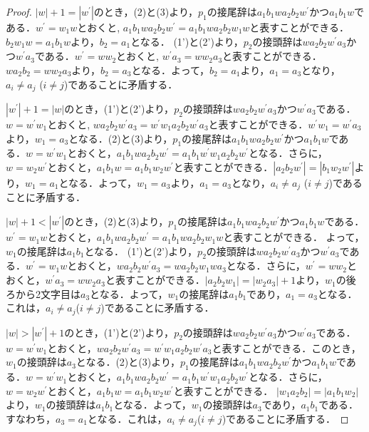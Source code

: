 \begin{proof}
$|w|+1=|w^{\prime}|$のとき，(2)と(3)より，$p_{1}$の接尾辞は$a_{1}b_{1}wa_{2}b_{2}w^{\prime}$かつ$a_{1}b_{1}w$である．$w^{\prime}=w_{1}w$とおくと, $a_{1}b_{1}wa_{2}b_{2}w^{\prime}=a_{1}b_{1}wa_{2}b_{2}w_{1}w$と表すことができる．
$b_{2}w_{1}w=a_{1}b_{1}w$より，$b_{2}=a_{1}$となる．
(1')と(2')より，$p_{2}$の接頭辞は$wa_{2}b_{2}w^{\prime}a_{3}$かつ$w^{\prime}a_{3}$である．$w^{\prime}=ww_{2}$とおくと, $w^{\prime}a_{3}=ww_{2}a_{3}$と表すことができる．$wa_{2}b_{2}=ww_{2}a_{3}$より，$b_{2}=a_{3}$となる．よって，$b_{2}=a_{1}$より，$a_{1}=a_{3}$となり，$a_{i} \ne a_{j}$ ($i \ne j$)であることに矛盾する．

$|w^{\prime}|+1=|w|$のとき，(1')と(2')より，$p_{2}$の接頭辞は$wa_{2}b_{2}w^{\prime}a_{3}$かつ$w^{\prime}a_{3}$である．
$w=w^{\prime}w_{1}$とおくと, $wa_{2}b_{2}w^{\prime}a_{3}=w^{\prime}w_{1}a_{2}b_{2}w^{\prime}a_{3}$と表すことができる．$w^{\prime}w_{1}=w^{\prime}a_{3}$より，$w_{1}=a_{3}$となる．(2)と(3)より，$p_{1}$の接尾辞は$a_{1}b_{1}wa_{2}b_{2}w^{\prime}$かつ$a_{1}b_{1}w$である．$w=w^{\prime}w_{1}$とおくと，$a_{1}b_{1}wa_{2}b_{2}w^{\prime}=a_{1}b_{1}w^{\prime}w_{1}a_{2}b_{2}w^{\prime}$となる．さらに，$w=w_{2}w^{\prime}$とおくと，$a_{1}b_{1}w=a_{1}b_{1}w_{2}w^{\prime}$と表すことができる．$|a_{2}b_{2}w^{\prime}|=|b_{1}w_{2}w^{\prime}|$より，$w_{1}=a_{1}$となる．よって，$w_{1}=a_{3}$より，$a_{1}=a_{3}$となり，$a_{i} \ne a_{j}$ ($i \ne j$)であることに矛盾する．

$|w|+1 < |w^{\prime}|$のとき，(2)と(3)より，$p_{1}$の接尾辞は$a_{1}b_{1}wa_{2}b_{2}w^{\prime}$かつ$a_{1}b_{1}w$である．
$w^{\prime}=w_{1}w$とおくと，$a_{1}b_{1}wa_{2}b_{2}w^{\prime}=a_{1}b_{1}wa_{2}b_{2}w_{1}w$と表すことができる．
よって，$w_{1}$の接尾辞は$a_{1}b_{1}$となる．
(1')と(2')より，$p_{2}$の接頭辞は$wa_{2}b_{2}w^{\prime}a_{3}$かつ$w^{\prime}a_{3}$である．$w^{\prime}=w_{1}w$とおくと，$wa_{2}b_{2}w^{\prime}a_{3}=wa_{2}b_{2}w_{1}wa_{3}$となる．さらに，$w^{\prime}=ww_{2}$とおくと，$w^{\prime}a_{3}=ww_{2}a_{3}$と表すことができる．$|a_{2}b_{2}w_{1}|=|w_{2}a_{3}|+1$より，$w_{1}$の後ろから2文字目は$a_{3}$となる．よって，$w_{1}$の接尾辞は$a_{1}b_{1}$であり，$a_{1}=a_{3}$となる．
これは，$a_{i} \ne a_{j}$($i \ne j$)であることに矛盾する．

$|w| > |w^{\prime}|+1$のとき，(1')と(2')より，$p_{2}$の接頭辞は$wa_{2}b_{2}w^{\prime}a_{3}$かつ$w^{\prime}a_{3}$である．
$w=w^{\prime}w_{1}$とおくと，$wa_{2}b_{2}w^{\prime}a_{3}=w^{\prime}w_{1}a_{2}b_{2}w^{\prime}a_{3}$と表すことができる．このとき，$w_{1}$の接頭辞は$a_{3}$となる．(2)と(3)より，$p_{1}$の接尾辞は$a_{1}b_{1}wa_{2}b_{2}w^{\prime}$かつ$a_{1}b_{1}w$である．$w=w^{\prime}w_{1}$とおくと，$a_{1}b_{1}wa_{2}b_{2}w^{\prime}=a_{1}b_{1}w^{\prime}w_{1}a_{2}b_{2}w^{\prime}$となる．さらに，$w=w_{2}w^{\prime}$とおくと，$a_{1}b_{1}w=a_{1}b_{1}w_{2}w^{\prime}$と表すことができる．
$|w_{1}a_{2}b_{2}|=|a_{1}b_{1}w_{2}|$より，$w_{1}$の接頭辞は$a_{1}b_{1}$となる．よって，$w_{1}$の接頭辞は$a_{3}$であり，$a_{1}b_{1}$である．すなわち，$a_{3}=a_{1}$となる．これは，$a_{i} \ne a_{j}$($i \ne j$)であることに矛盾する．
\smallskip


\end{proof}
